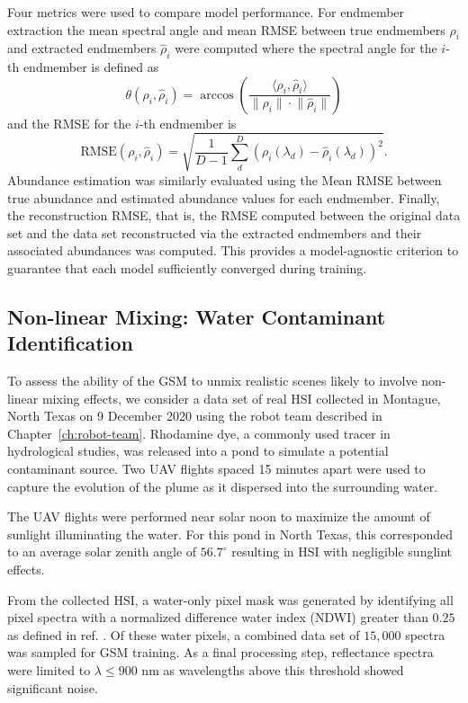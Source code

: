 Four metrics were used to compare model performance. For endmember extraction
the mean spectral angle and mean RMSE between true endmembers $\rho_i$ and
extracted endmembers $\hat{\rho}_i$ were computed where the spectral angle for
the $i$-th endmember is defined as
\begin{equation}
    \theta(\rho_i, \hat{\rho}_i) =  \arccos\left( \dfrac{\langle \rho_i, \hat{\rho}_i \rangle}{\lVert \rho_i \rVert \cdot \lVert \hat{\rho}_i \rVert}\right)
\end{equation}
and the RMSE for the $i$-th endmember is
\begin{equation}
    \text{RMSE}(\rho_i, \hat{\rho}_i) = \sqrt{\frac{1}{D-1}\sum_d^D\left(\rho_i(\lambda_d) - \hat{\rho}_i(\lambda_d) \right)^2}.
\end{equation}
Abundance estimation was similarly evaluated using the Mean RMSE between true
abundance and estimated abundance values for each endmember. Finally, the
reconstruction RMSE, that is, the RMSE computed between the original data set
and the data set reconstructed via the extracted endmembers and their associated
abundances was computed. This provides a model-agnostic criterion to guarantee
that each model sufficiently converged during training.

\subsection{Non-linear Mixing: Water Contaminant Identification}

To assess the ability of the GSM to unmix realistic scenes likely to involve
non-linear mixing effects, we consider a data set of real HSI collected in
Montague, North Texas on 9 December 2020 using the robot team described in
Chapter~\ref{ch:robot-team}. Rhodamine dye, a commonly used tracer in
hydrological studies, was released into a pond to simulate a potential
contaminant source. Two UAV flights spaced 15 minutes apart were used to capture
the evolution of the plume as it dispersed into the surrounding water.

The UAV flights were performed near solar noon to maximize the amount of
sunlight illuminating the water. For this pond in North Texas, this corresponded
to an average solar zenith angle of $56.7^{\circ}$ resulting in HSI with
negligible sunglint effects.

From the collected HSI, a water-only pixel mask was generated by identifying all
pixel spectra with a normalized difference water index (NDWI) greater than
$0.25$ as defined in ref. \cite{ndwi}. Of these water pixels, a combined data
set of $15,000$ spectra was sampled for GSM training. As a final processing
step, reflectance spectra were limited to $\lambda \leq 900$ nm as wavelengths
above this threshold showed significant noise.

